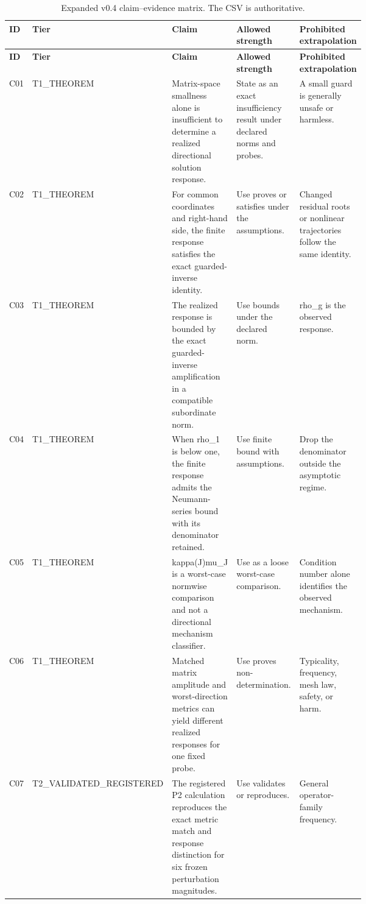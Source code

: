 \begin{xltabular}{0.99\linewidth}{@{}p{0.07\linewidth}p{0.12\linewidth}p{0.27\linewidth}p{0.22\linewidth}X@{}}
\caption{Expanded v0.4 claim--evidence matrix. The CSV is authoritative.}\label{tab:S7}\\
\toprule
\textbf{ID} & \textbf{Tier} & \textbf{Claim} & \textbf{Allowed strength} & \textbf{Prohibited extrapolation} \\
\midrule\endfirsthead
\toprule
\textbf{ID} & \textbf{Tier} & \textbf{Claim} & \textbf{Allowed strength} & \textbf{Prohibited extrapolation} \\
\midrule\endhead
C01 & T1\_\allowbreak{}THEOREM & Matrix-space smallness alone is insufficient to determine a realized directional solution response. & State as an exact insufficiency result under declared norms and probes. & A small guard is generally unsafe or harmless. \\
C02 & T1\_\allowbreak{}THEOREM & For common coordinates and right-hand side, the finite response satisfies the exact guarded-inverse identity. & Use proves or satisfies under the assumptions. & Changed residual roots or nonlinear trajectories follow the same identity. \\
C03 & T1\_\allowbreak{}THEOREM & The realized response is bounded by the exact guarded-inverse amplification in a compatible subordinate norm. & Use bounds under the declared norm. & rho\_\allowbreak{}g is the observed response. \\
C04 & T1\_\allowbreak{}THEOREM & When rho\_\allowbreak{}1 is below one, the finite response admits the Neumann-series bound with its denominator retained. & Use finite bound with assumptions. & Drop the denominator outside the asymptotic regime. \\
C05 & T1\_\allowbreak{}THEOREM & kappa(J)mu\_\allowbreak{}J is a worst-case normwise comparison and not a directional mechanism classifier. & Use as a loose worst-case comparison. & Condition number alone identifies the observed mechanism. \\
C06 & T1\_\allowbreak{}THEOREM & Matched matrix amplitude and worst-direction metrics can yield different realized responses for one fixed probe. & Use proves non-determination. & Typicality, frequency, mesh law, safety, or harm. \\
C07 & T2\_\allowbreak{}VALIDATED\_\allowbreak{}REGISTERED & The registered P2 calculation reproduces the exact metric match and response distinction for six frozen perturbation magnitudes. & Use validates or reproduces. & General operator-family frequency. \\

\end{xltabular}
